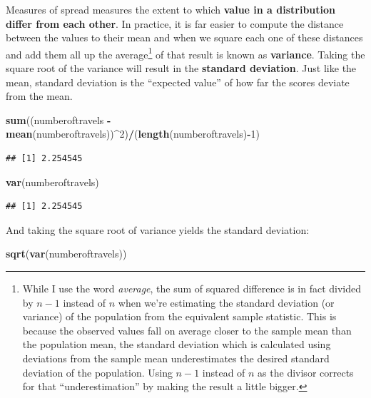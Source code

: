 \documentclass[]{article}
\newenvironment{Shaded}{\begin{snugshade}}{\end{snugshade}}
\newcommand{\DecValTok}[1]{\textcolor[rgb]{0.00,0.00,0.81}{#1}}
\newcommand{\KeywordTok}[1]{\textcolor[rgb]{0.13,0.29,0.53}{\textbf{#1}}}
\newcommand{\NormalTok}[1]{#1}
\newcommand{\OperatorTok}[1]{\textcolor[rgb]{0.81,0.36,0.00}{\textbf{#1}}}
\newcommand{\StringTok}[1]{\textcolor[rgb]{0.31,0.60,0.02}{#1}}
\begin{document}
Measures of spread measures the extent to which \textbf{value in a
distribution differ from each other}. In practice, it is far easier to
compute the distance between the values to their mean and when we square
each one of these distances and add them all up the average\footnote{While
  I use the word \emph{average}, the sum of squared difference is in
  fact divided by \(n-1\) instead of \(n\) when we're estimating the
  standard deviation (or variance) of the population from the equivalent
  sample statistic. This is because the observed values fall on average
  closer to the sample mean than the population mean, the standard
  deviation which is calculated using deviations from the sample mean
  underestimates the desired standard deviation of the population. Using
  \(n-1\) instead of \(n\) as the divisor corrects for that
  ``underestimation'' by making the result a little bigger.} of that
result is known as \textbf{variance}. Taking the square root of the
variance will result in the \textbf{standard deviation}. Just like the
mean, standard deviation is the ``expected value'' of how far the scores
deviate from the mean.

\begin{Shaded}
\begin{Highlighting}[]
\KeywordTok{sum}\NormalTok{((numberoftravels }\OperatorTok{-}\StringTok{ }\KeywordTok{mean}\NormalTok{(numberoftravels))}\OperatorTok{^}\DecValTok{2}\NormalTok{)}\OperatorTok{/}\NormalTok{(}\KeywordTok{length}\NormalTok{(numberoftravels)}\OperatorTok{-}\DecValTok{1}\NormalTok{)}
\end{Highlighting}
\end{Shaded}

\begin{verbatim}
## [1] 2.254545
\end{verbatim}

\begin{Shaded}
\begin{Highlighting}[]
\KeywordTok{var}\NormalTok{(numberoftravels)}
\end{Highlighting}
\end{Shaded}

\begin{verbatim}
## [1] 2.254545
\end{verbatim}

And taking the square root of variance yields the standard deviation:

\begin{Shaded}
\begin{Highlighting}[]
\KeywordTok{sqrt}\NormalTok{(}\KeywordTok{var}\NormalTok{(numberoftravels))}
\end{Highlighting}
\end{Shaded}
\end{document}
